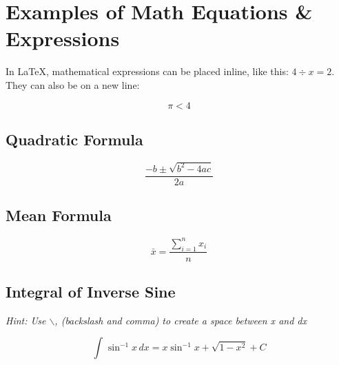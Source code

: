 \section{Examples of Math Equations \& Expressions}

In LaTeX, mathematical expressions can be placed inline, like this: \(4 \div x = 2\). They can also be on a new line:

\[\pi < 4\]

\subsection{Quadratic Formula}

\[\frac{-b \pm \sqrt{b^{2} - 4ac}}{2a}\]

\subsection{Mean Formula}

\[\bar{x} = \frac{\sum_{i = 1}^{n} x_{i}}{n}\]

\subsection{Integral of Inverse Sine}

\textit{Hint: Use $\backslash$, (backslash and comma) to create a space between x and dx}

\[\int_{}{}\sin^{-1}x \, dx = x\sin^{-1} x + \sqrt{1 - x^{2}} + C\]
